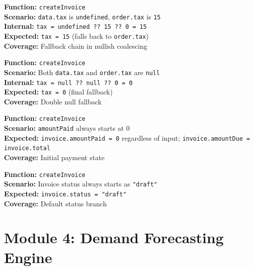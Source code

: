 \documentclass[12pt,a4paper]{report}
\newcommand{\pone}{\textbf{\color{p1red}P1}}
\newcommand{\ptwo}{\textbf{\color{p2orange}P2}}
\begin{document}
\begin{tcolorbox}[testbox, title={INV-009 \hfill \ptwo}]
\textbf{Function:} \texttt{createInvoice} \\
\textbf{Scenario:} \texttt{data.tax} is \texttt{undefined}, \texttt{order.tax} is \texttt{15} \\
\textbf{Internal:} \texttt{tax = undefined ?? 15 ?? 0 = 15} \\
\textbf{Expected:} \texttt{tax = 15} (falls back to \texttt{order.tax}) \\
\textbf{Coverage:} Fallback chain in nullish coalescing
\end{tcolorbox}

\begin{tcolorbox}[testbox, title={INV-010 \hfill \ptwo}]
\textbf{Function:} \texttt{createInvoice} \\
\textbf{Scenario:} Both \texttt{data.tax} and \texttt{order.tax} are \texttt{null} \\
\textbf{Internal:} \texttt{tax = null ?? null ?? 0 = 0} \\
\textbf{Expected:} \texttt{tax = 0} (final fallback) \\
\textbf{Coverage:} Double null fallback
\end{tcolorbox}

\begin{tcolorbox}[testbox, title={INV-011 \hfill \pone}]
\textbf{Function:} \texttt{createInvoice} \\
\textbf{Scenario:} \texttt{amountPaid} always starts at 0 \\
\textbf{Expected:} \texttt{invoice.amountPaid = 0} regardless of input; \texttt{invoice.amountDue = invoice.total} \\
\textbf{Coverage:} Initial payment state
\end{tcolorbox}

\begin{tcolorbox}[testbox, title={INV-012 \hfill \pone}]
\textbf{Function:} \texttt{createInvoice} \\
\textbf{Scenario:} Invoice status always starts as \texttt{"draft"} \\
\textbf{Expected:} \texttt{invoice.status = "draft"} \\
\textbf{Coverage:} Default status branch
\end{tcolorbox}


\chapter{Module 4: Demand Forecasting Engine}
\end{document}
